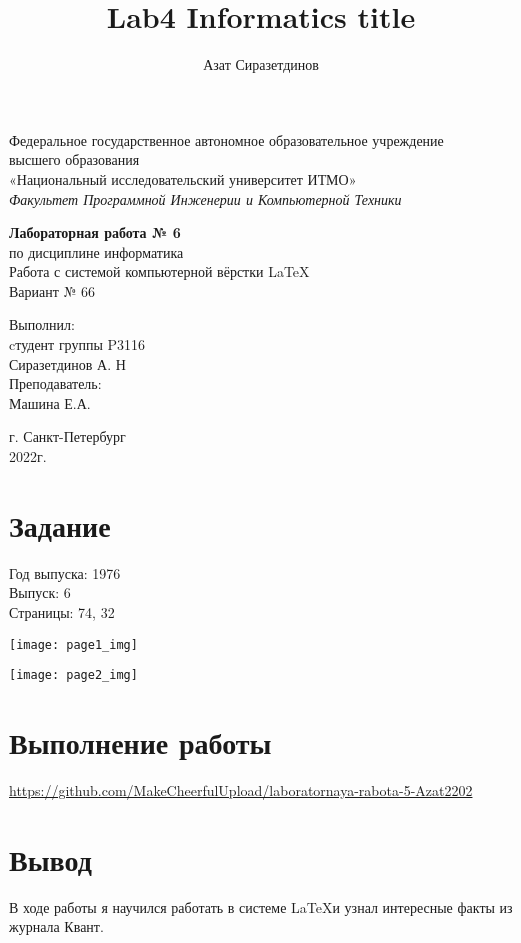 \documentclass[12pt]{article}
\title{Lab4 Informatics title}
\author{Азат Сиразетдинов}
\begin{document}
	\thispagestyle{empty}
	\begin{center}
		Федеральное государственное автономное образовательное учреждение\\ 
		высшего образования\\
		«Национальный исследовательский университет ИТМО»\\
		\textit{Факультет Программной Инженерии и Компьютерной Техники}\\
	\end{center}
	\vspace{2cm}
	\begin{center}
		\large
		\textbf{Лабораторная работа № 6}\\
		по дисциплине информатика\\
		Работа с системой компьютерной вёрстки \LaTeX \\
		Вариант № 66
	\end{center}
	\vspace{7cm}
	\begin{flushright}
		Выполнил:\\
		cтудент  группы P3116\\
		Сиразетдинов А. Н\\
		Преподаватель: \\
		Машина Е.А.\\
	\end{flushright}
	\vspace{6cm}
	\begin{center}
		г. Санкт-Петербург\\
		2022г.
	\end{center}
	\newpage
	\tableofcontents
	\newpage
	\section{Задание}
	Год выпуска: 1976\\
	Выпуск: 6\\
	Страницы: 74, 32\\
	\begin{minipage}[h]{0.49\linewidth}
		\texttt{[image: page1\_img]}
	\end{minipage}
	\hfill
	\begin{minipage}[h]{0.49\linewidth}
		\texttt{[image: page2\_img]}
	\end{minipage}
	\newpage
	
	\section{Выполнение работы}
	\url{https://github.com/MakeCheerfulUpload/laboratornaya-rabota-5-Azat2202}
	\newpage
	
	\section{Вывод}
	В ходе работы я научился работать в системе \LaTeX и узнал интересные факты из журнала Квант.
\end{document}
